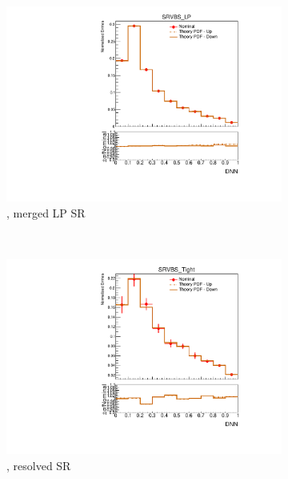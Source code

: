 \begin{figure}[ht]
\begin{subfigure}[b]{0.3\textwidth}
        \includegraphics[width=\textwidth]{figures/1lep/PDFUnc/TheoryPDF/W_0ptag1pfat0pjet_0ptv_SRVBS_LP_DNN_SysTheoryPDF_W__1up_Norm.pdf}
        \caption{\Wjets, merged LP SR}
    \end{subfigure}
    \\
    \vspace{15mm}
    \begin{subfigure}[b]{0.3\textwidth}
        \includegraphics[width=\textwidth]{figures/1lep/PDFUnc/TheoryPDF/Z_0ptag2pjet_0ptv_SRVBS_Tight_DNN_SysTheoryPDF_Z__1up_Norm.pdf}
        \caption{\Zjets, resolved SR}
    \end{subfigure}
    \begin{subfigure}[b]{0.3\textwidth}

\end{subfigure}
\end{figure}
